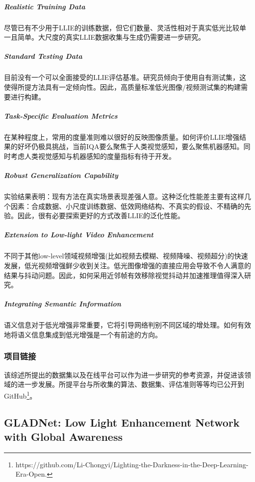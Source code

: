 \documentclass[letterpaper,12pt]{article}
\begin{document}
		\subparagraph{Realistic Training Data}
		
		尽管已有不少用于LLIE的训练数据，但它们数量、灵活性相对于真实低光比较单一且简单。大尺度的真实LLIE数据收集与生成仍需要进一步研究。
		
		\subparagraph{Standard Testing Data}
		
		目前没有一个可以全面接受的LLIE评估基准。研究员倾向于使用自有测试集，这使得所提方法具有一定倾向性。因此，高质量标准低光图像/视频测试集的构建需要进行构建。
		
		\subparagraph{Task-Specific Evaluation Metrics}
		
		在某种程度上，常用的度量准则难以很好的反映图像质量。如何评价LLIE增强结果的好坏仍极具挑战，当前IQA要么聚焦于人类视觉感知，要么聚焦机器感知。同时考虑人类视觉感知与机器感知的度量指标有待于开发。
		
		\subparagraph{Robust Generalization Capability}
		
		实验结果表明：现有方法在真实场景表现差强人意。这种泛化性能差主要有这样几个因素：合成数据、小尺度训练数据、低效网络结构、不真实的假设、不精确的先验。因此，很有必要探索更好的方式改善LLIE的泛化性能。
		
		\subparagraph{Extension to Low-light Video Enhancement}
		
		不同于其他low-level领域视频增强(比如视频去模糊、视频降噪、视频超分)的快速发展，低光视频增强鲜少收到关注。低光图像增强的直接应用会导致不令人满意的结果与抖动问题。因此，如何采用近邻帧有效移除视觉抖动并加速推理值得深入研究。
		
		\subparagraph{Integrating Semantic Information}
		
		语义信息对于低光增强非常重要，它将引导网络判别不同区域的增处理。如何有效地将语义信息集成到低光增强是一个有前途的方向。
	
	
	\subsubsection{项目链接}
	
	该综述所提出的数据集以及在线平台可以作为进一步研究的参考资源，并促进该领域的进一步发展。所提平台与所收集的算法、数据集、评估准则等等均已公开到GitHub\footnote{https://github.com/Li-Chongyi/Lighting-the-Darkness-in-the-Deep-Learning-Era-Open.
	}。
	
	\subsection{GLADNet: Low Light Enhancement Network with Global Awareness}
	
\end{document}
